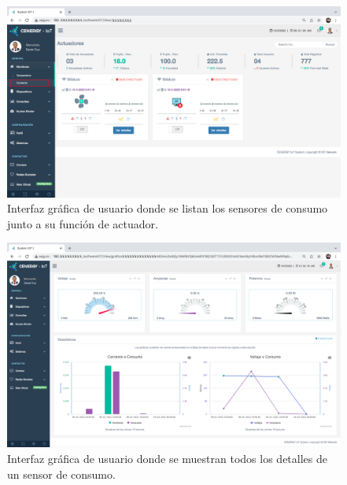 
\begin{landscape} %
\begin{figure}[htpb]
\centering 
\includegraphics[width=1.52\textwidth]{./Figures/gui/3.png}
\caption{Interfaz gráfica de usuario donde se listan los sensores de consumo junto a su función de actuador.}
\label{fig:gui3}
\end{figure}
\end{landscape} %


\begin{landscape} %
\begin{figure}[htpb]
\centering 
\includegraphics[width=1.52\textwidth]{./Figures/gui/3-1.png}
\caption{Interfaz gráfica de usuario donde se muestran todos los detalles de un sensor de consumo.}
\label{fig:gui3-1}
\end{figure}
\end{landscape} %

